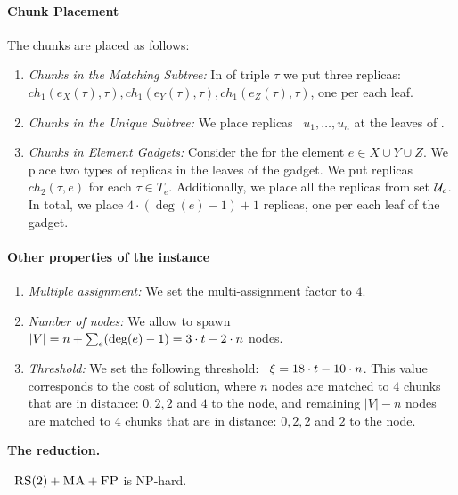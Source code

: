 \paragraph{Chunk Placement}
The chunks are placed as follows:
\begin{enumerate}
  \item \emph{Chunks in the Matching Subtree:} In {\TripleGadget} of triple $\tau$ we put
  three replicas:
 ~$ch_1(e_X(\tau), \tau), ch_1(e_Y(\tau), \tau), ch_1(e_Z(\tau), \tau)$, one per each leaf.
  \item \emph{Chunks in the Unique Subtree:} We place replicas
 ~$u_1,\ldots, u_n$ at the leaves of \UnqGadgets.
 \item \emph{Chunks in Element Gadgets:} Consider the \ElGadget{} for the element $e \in X\cup Y\cup Z$.
 We place two types of replicas in the leaves of the gadget.
 We put replicas $ch_2(\tau, e)$ for each $\tau \in T_e$.
 Additionally, we place all the replicas from set ${\mathcal{U}_e}$.
 In total, we place $4\cdot (\deg(e) - 1) + 1$ replicas, one per each leaf of the gadget.
\end{enumerate}

\paragraph{Other properties of the instance}
\begin{enumerate}
  \item \emph{Multiple assignment:} We set the multi-assignment factor to $4$.
  \item \emph{Number of nodes:} We allow to spawn
 ~$|V| = n + \sum_{e}(\deg(e)-1) = 3\cdot t - 2\cdot n$ nodes.
 \item \emph{Threshold:} We set the following threshold:
 ~$\xi = 18\cdot t - 10\cdot n$.
 This value corresponds to the cost of solution, where $n$ nodes are matched to $4$ chunks that are in distance: $0, 2, 2$ and $4$ to the node, and remaining $|V|-n$ nodes are matched to $4$ chunks that are in distance: $0, 2, 2$ and $2$ to the node.
\end{enumerate}

\textbf{The reduction.}


\begin{theorem}
 ~$\textsc{RS}(2)+\textsc{MA}+\textsc{FP}$ is NP-hard.
\end{theorem}


